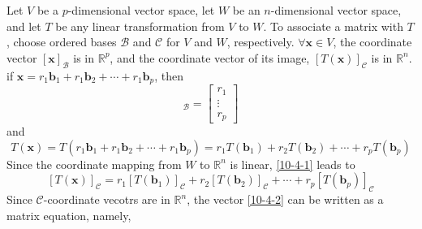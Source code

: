 \noindent Let $V$ be a $p$-dimensional vector space, let $W$ be an $n$-dimensional vector space, and let $T$ be any linear transformation from $V$ to $W$. To associate a matrix with $T$, choose ordered bases $\mathcal{B}$ and $\mathcal{C}$ for $V$ and $W$, respectively.  
\indent $\forall \mathbf{x}\in V$, the coordinate vector $[\mathbf{x}]_{\mathcal{B}}$ is in $\mathbb{R}^p$, and the coordinate vector of its image, $[T(\mathbf{x})]_{\mathcal{C}}$ is in $\mathbb{R}^n$.
    if $\mathbf{x} = r_1\mathbf{b}_1 + r_1\mathbf{b}_2 + \cdots + r_1\mathbf{b}_p$, then 
    \begin{equation*}
        [\mathbf{x}]_{\mathcal{B}} = \begin{bmatrix}
            r_1 \\
            \vdots \\
            r_p
        \end{bmatrix}
    \end{equation*} and 
    \begin{equation}\label{10-4-1}
        T(\mathbf{x}) = T( r_1\mathbf{b}_1 + r_1\mathbf{b}_2 + \cdots + r_1\mathbf{b}_p) = r_1T(\mathbf{b}_1) + r_2T(\mathbf{b}_2) + \cdots + r_pT(\mathbf{b}_p)
    \end{equation}
    Since the coordinate mapping from $W$ to $\mathbb{R}^n$ is linear, \cref{10-4-1} leads to
    \begin{equation}\label{10-4-2}
        [T(\mathbf{x})]_{\mathcal{C}} = r_1[T(\mathbf{b}_1)]_{\mathcal{C}} + r_2[T(\mathbf{b}_2)]_{\mathcal{C}} + \cdots + r_p[T(\mathbf{b}_p)]_{\mathcal{C}}
    \end{equation}
    Since $\mathcal{C}$-coordinate vecotrs are in $\mathbb{R}^n$, the vector \cref{10-4-2} can be written as a matrix equation, namely,
    
